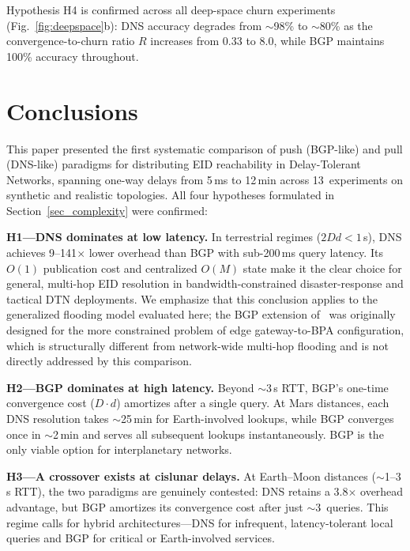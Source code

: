 \documentclass[journal,twocolumn]{IEEEtran}
\begin{document}
Hypothesis H4 is confirmed across all deep-space churn experiments (Fig.~\ref{fig:deepspace}b): DNS accuracy degrades from $\sim$98\% to $\sim$80\% as the convergence-to-churn ratio $R$ increases from 0.33 to 8.0, while BGP maintains 100\% accuracy throughout.

\section{Conclusions}
\label{sec_conclusions}

This paper presented the first systematic comparison of push (BGP-like) and pull (DNS-like) paradigms for distributing EID reachability in Delay-Tolerant Networks, spanning one-way delays from 5\,ms to 12\,min across 13~experiments on synthetic and realistic topologies. All four hypotheses formulated in Section~\ref{sec_complexity} were confirmed:

\textbf{H1---DNS dominates at low latency.} In terrestrial regimes ($2Dd < 1$\,s), DNS achieves 9--141$\times$ lower overhead than BGP with sub-200\,ms query latency. Its $O(1)$ publication cost and centralized $O(M)$ state make it the clear choice for general, multi-hop EID resolution in bandwidth-constrained disaster-response and tactical DTN deployments. We emphasize that this conclusion applies to the generalized flooding model evaluated here; the BGP extension of~\cite{feldmann2025bgp} was originally designed for the more constrained problem of edge gateway-to-BPA configuration, which is structurally different from network-wide multi-hop flooding and is not directly addressed by this comparison.

\textbf{H2---BGP dominates at high latency.} Beyond $\sim$3\,s RTT, BGP's one-time convergence cost ($D \cdot d$) amortizes after a single query. At Mars distances, each DNS resolution takes $\sim$25\,min for Earth-involved lookups, while BGP converges once in $\sim$2\,min and serves all subsequent lookups instantaneously. BGP is the only viable option for interplanetary networks.

\textbf{H3---A crossover exists at cislunar delays.} At Earth--Moon distances ($\sim$1--3\,s RTT), the two paradigms are genuinely contested: DNS retains a 3.8$\times$ overhead advantage, but BGP amortizes its convergence cost after just $\sim$3~queries. This regime calls for hybrid architectures---DNS for infrequent, latency-tolerant local queries and BGP for critical or Earth-involved services.
\end{document}
